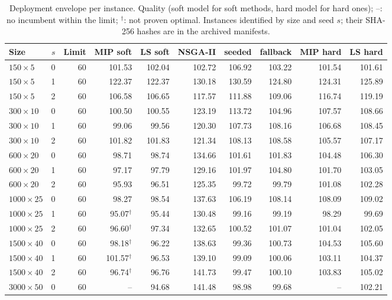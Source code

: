 \begin{table}[H]
\centering
\caption{Deployment envelope per instance. Quality (soft model for soft methods, hard model for hard ones); --: no incumbent within the limit; $^\dagger$: not proven optimal. Instances identified by size and seed $s$; their SHA-256 hashes are in the archived manifests.\label{tab:envelope-instances}}
\scriptsize
\setlength{\tabcolsep}{3pt}
\begin{tabular}{lrrrrrrrrr}
\toprule
Size & $s$ & Limit & MIP soft & LS soft & NSGA-II & seeded & fallback & MIP hard & LS hard\\
\midrule
$150\times5$ & 0 & 60 & 101.53 & 102.04 & 102.72 & 106.92 & 103.22 & 101.54 & 101.61\\
$150\times5$ & 1 & 60 & 122.37 & 122.37 & 130.18 & 130.59 & 124.80 & 124.31 & 125.89\\
$150\times5$ & 2 & 60 & 106.58 & 106.65 & 117.57 & 111.88 & 109.06 & 116.74 & 119.19\\
$300\times10$ & 0 & 60 & 100.50 & 100.55 & 123.19 & 113.72 & 104.96 & 107.57 & 108.66\\
$300\times10$ & 1 & 60 & 99.06 & 99.56 & 120.30 & 107.73 & 108.16 & 106.68 & 108.45\\
$300\times10$ & 2 & 60 & 101.82 & 101.83 & 121.34 & 108.13 & 108.58 & 105.57 & 107.17\\
$600\times20$ & 0 & 60 & 98.71 & 98.74 & 134.66 & 101.61 & 101.83 & 104.48 & 106.30\\
$600\times20$ & 1 & 60 & 97.17 & 97.79 & 129.16 & 101.97 & 104.80 & 101.70 & 103.05\\
$600\times20$ & 2 & 60 & 95.93 & 96.51 & 125.35 & 99.72 & 99.79 & 101.08 & 102.28\\
$1000\times25$ & 0 & 60 & 98.27 & 98.54 & 137.63 & 106.19 & 108.14 & 108.09 & 109.02\\
$1000\times25$ & 1 & 60 & 95.07$^\dagger$ & 95.44 & 130.48 & 99.16 & 99.19 & 98.29 & 99.69\\
$1000\times25$ & 2 & 60 & 96.60$^\dagger$ & 97.34 & 132.65 & 100.52 & 101.07 & 101.04 & 102.05\\
$1500\times40$ & 0 & 60 & 98.18$^\dagger$ & 96.22 & 138.63 & 99.36 & 100.73 & 104.53 & 105.60\\
$1500\times40$ & 1 & 60 & 101.57$^\dagger$ & 96.53 & 139.10 & 99.09 & 100.06 & 103.11 & 104.37\\
$1500\times40$ & 2 & 60 & 96.74$^\dagger$ & 96.76 & 141.73 & 99.47 & 100.10 & 103.83 & 105.02\\
$3000\times50$ & 0 & 60 & -- & 94.68 & 141.48 & 98.98 & 99.68 & -- & 102.21\\

\end{tabular}
\end{table}
